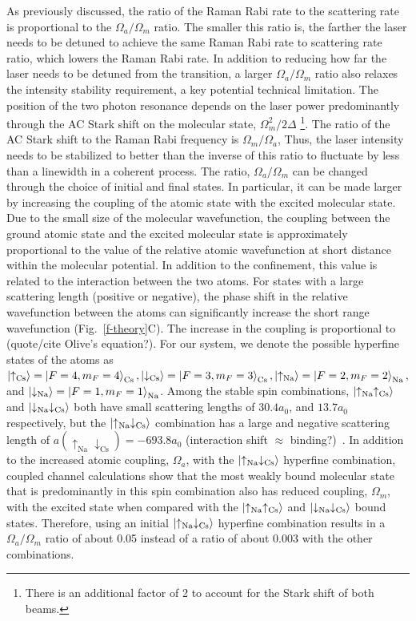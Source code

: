 \documentclass[aps,prl,twocolumn,superscriptaddress]{revtex4-1}
\begin{document}
As previously discussed, the ratio of the Raman Rabi rate to the scattering rate is proportional to the $ \Omega_a/\Omega_m $ ratio. The smaller this ratio is, the farther the laser needs to be detuned to achieve the same Raman Rabi rate to scattering rate ratio, which lowers the Raman Rabi rate. In addition to reducing how far the laser needs to be detuned from the transition, a larger $ \Omega_a/\Omega_m$ ratio also relaxes the intensity stability requirement, a key potential technical limitation. The position of the two photon resonance depends on the laser power predominantly through the AC Stark shift on the molecular state, $ \Omega_m^2 / 2\Delta $ \footnote{There is an additional factor of 2 to account for the Stark shift of both beams.}. The ratio of the AC Stark shift to the Raman Rabi frequency is $ \Omega_m / \Omega_a $, Thus, the laser intensity needs to be stabilized to better than the inverse of this ratio to fluctuate by less than a linewidth in a coherent process. The ratio, $ \Omega_a/\Omega_m $ can be changed through the choice of initial and final states. In particular, it can be made larger by increasing the coupling of the atomic state with the excited molecular state. Due to the small size of the molecular wavefunction, the coupling between the ground atomic state and the excited molecular state is approximately proportional to the value of the relative atomic wavefunction at short distance within the molecular potential. In addition to the confinement, this value is related to the interaction between the two atoms. For states with a large scattering length (positive or negative), the phase shift in the relative wavefunction between the atoms can significantly increase the short range wavefunction (Fig.~\ref{f-theory}C). The increase in the coupling is proportional to (quote/cite Olive's equation?). For our system, we denote the possible hyperfine states of the atoms as $ \ket{\uparrow_{\text{Cs}}} = \ket{F=4,m_F=4}_{\text{Cs}}, \ket{\downarrow_{\text{Cs}}} = \ket{F=3,m_F=3}_{\text{Cs}}, \ket{\uparrow_{\text{Na}}} = \ket{F=2,m_F=2}_{\text{Na}}, $ and $ \ket{\downarrow_{\text{Na}}} = \ket{F=1,m_F=1}_{\text{Na}}$. Among the stable spin combinations, $\ket{\uparrow_{\text{Na}}\uparrow_{\text{Cs}}}$ and $\ket{\downarrow_{\text{Na}}\downarrow_{\text{Cs}}} $ both have small scattering lengths of $ 30.4a_0 $, and $ 13.7a_0 $ respectively, but the $\ket{\uparrow_{\text{Na}} \downarrow_{\text{Cs}}} $ combination has a large and negative scattering length of $ a(\uparrow_{\text{Na}} \downarrow_{\text{Cs}}) = -693.8a_0 $ (interaction shift $\approx$ binding?)~\cite{Hood2019}. In addition to the increased atomic coupling, $ \Omega_a $, with the $\ket{\uparrow_{\text{Na}} \downarrow_{\text{Cs}}}$ hyperfine combination, coupled channel calculations show that the most weakly bound molecular state that is predominantly in this spin combination also has reduced coupling, $ \Omega_m $, with the excited state when compared with the $\ket{\uparrow_{\text{Na}}\uparrow_{\text{Cs}}}$ and $\ket{\downarrow_{\text{Na}}\downarrow_{\text{Cs}}} $ bound states. Therefore, using an initial $\ket{\uparrow_{\text{Na}} \downarrow_{\text{Cs}}}$ hyperfine combination results in a $ \Omega_a/\Omega_m$ ratio of about 0.05 instead of a ratio of about 0.003 with the other combinations.
\end{document}
